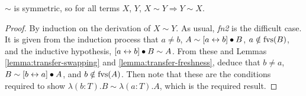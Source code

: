 \begin{lemma}
\(\sim\) is symmetric, so for all terms \(X\), \(Y\), \(X \sim Y \Longrightarrow Y \sim X\).
\end{lemma}
\begin{proof}
By induction on the derivation of \(X \sim Y\).
As usual, \emph{fn2} is the difficult case.
It is given from the induction process that \(a \neq b\), \(A \sim [a \leftrightarrow b] \bullet B\), \(a \notin \mathrm{fvs}(B)\), and the inductive hypothesis, \([a \leftrightarrow b] \bullet B \sim A\).
From these and Lemmas \ref{lemma:transfer-swapping} and \ref{lemma:transfer-freshness}, deduce that \(b \neq a\), \(B \sim [b \leftrightarrow a] \bullet A\), and \(b \notin \mathrm{fvs}(A)\).
Then note that these are the conditions required to show \(\lambda (b:T).B \sim \lambda (a:T).A\), which is the required result.
\end{proof}

